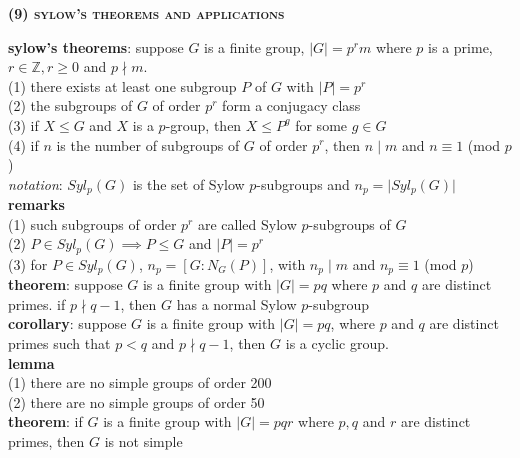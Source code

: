 \documentclass[a4paper]{article}
\newcommand\abs[1]{\ensuremath{\lvert#1\rvert}}
\begin{document}
\newpage
\begin{framed}
	\begin{center}
		\textbf{\textsc{(9) sylow's theorems and applications}}
	\end{center}
	
	\noindent
	\textbf{sylow's theorems}: suppose $G$ is a finite group, $\abs{G} = p^rm$ where $p$ is a prime, $r \in \mathbb{Z}, r \geq 0$ and $p \nmid m$.\\
	(1) there exists at least one subgroup $P$ of $G$ with $\abs{P} = p^r$\\
	(2) the subgroups of $G$ of order $p^r$ form a conjugacy class\\
	(3) if $X \leq G$ and $X$ is a $p$-group, then $X \leq P^g$ for some $g \in G$\\
	(4) if $n$ is the number of subgroups of $G$ of order $p^r$, then $n \; \vert \; m$ and $n \equiv 1$ (mod $p$)\\
	
	\noindent
	\textit{notation}: $Syl_p(G)$ is the set of Sylow $p$-subgroups and $n_p = \abs{Syl_p(G)}$\\
	
	\noindent
	\textbf{remarks}\\
	(1) such subgroups of order $p^r$ are called Sylow $p$-subgroups of $G$\\
	(2) $P \in Syl_p(G) \implies P \leq G$ and $\abs{P} = p^r$\\
	(3) for $P \in Syl_p(G)$, $n_p = [G:N_G(P)]$, with $n_p \; \vert \; m$ and $n_p \equiv 1$ (mod $p$)\\
	
	\noindent
	\textbf{theorem}: suppose $G$ is a finite group with $\abs{G} = pq$ where $p$ and $q$ are distinct primes. if $p \nmid q - 1$, then $G$ has a normal Sylow $p$-subgroup\\
	
	\noindent
	\textbf{corollary}: suppose $G$ is a finite group with $\abs{G} = pq$, where $p$ and $q$ are distinct primes such that $p < q$ and $p \nmid q - 1$, then $G$ is a cyclic group.\\
	
	\noindent
	\textbf{lemma}\\
	(1) there are no simple groups of order 200\\
	(2) there are no simple groups of order 50\\
	
	\noindent
	\textbf{theorem}: if $G$ is a finite group with $\abs{G} = pqr$ where $p, q$ and $r$ are distinct primes, then $G$ is not simple
\end{framed}
\end{document}
